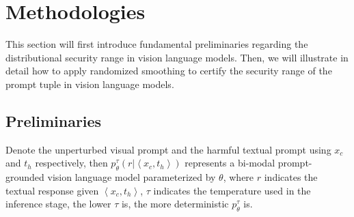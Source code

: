 \section{Methodologies}
This section will first introduce fundamental preliminaries regarding the distributional security range in vision language models. Then, we will illustrate in detail how to apply randomized smoothing to certify the security range of the prompt tuple in vision language models. 

\subsection{Preliminaries}
Denote the unperturbed visual prompt and the harmful textual prompt using $x_c$ and $t_h$ respectively, then $p_{\theta}^{\tau}(r | \left<x_c, t_h\right>)$ represents a bi-modal prompt-grounded vision language model parameterized by $\theta$, where $r$ indicates the textual response given $\left<x_c, t_h\right>$, $\tau$ indicates the temperature used in the inference stage, the lower $\tau$ is, the more deterministic $p^{\tau}_{\theta}$ is. 
